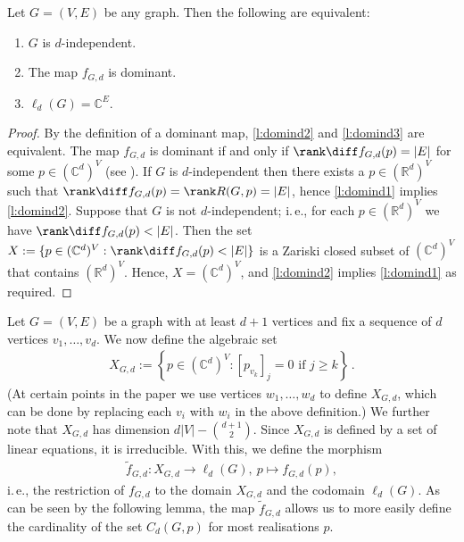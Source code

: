 \begin{lemma}\label{l:domind}
	Let $G=(V,E)$ be any graph.
	Then the following are equivalent:
	\begin{enumerate}
		\item \label{l:domind1} $G$ is $d$-independent.
		\item \label{l:domind2} The map $f_{G,d}$ is dominant.
		\item \label{l:domind3} $\ell_d(G) = \mathbb{C}^E$.
	\end{enumerate}
\end{lemma} 

\begin{proof}
	By the definition of a dominant map, \ref{l:domind2} and \ref{l:domind3} are equivalent.
	The map $f_{G,d}$ is dominant if and only if $\rank \diff f_{G,d}(p) = |E|$ for some $p \in (\mathbb{C}^{d})^V$ (see ).
	If $G$ is $d$-independent then there exists a $p \in (\mathbb{R}^{d})^V$ such that $\rank \diff f_{G,d}(p) = \rank R(G,p) = |E|$,
	hence \ref{l:domind1} implies \ref{l:domind2}.
	Suppose that $G$ is not $d$-independent;
	i.\,e., for each $p \in (\mathbb{R}^{d})^V$ we have $\rank \diff f_{G,d}(p) < |E|$.
	Then the set $X := \{ p \in (\mathbb{C}^{d})^V: \rank \diff f_{G,d}(p) < |E| \}$ is a Zariski closed subset of $(\mathbb{C}^{d})^V$ that contains $(\mathbb{R}^{d})^V$.
	Hence, $X = (\mathbb{C}^{d})^V$,
	and \ref{l:domind2} implies \ref{l:domind1} as required.
\end{proof}

Let $G=(V,E)$ be a graph with at least $d+1$ vertices and fix a sequence of $d$ vertices $v_1,\ldots, v_d$.
We now define the algebraic set
\begin{align}\label{eq:xset}
	X_{G,d} := \left\{ p \in (\mathbb{C}^{d})^V : [p_{v_k}]_j=0 \text{ if } j \geq k  \right\}\,.
\end{align}
(At certain points in the paper we use vertices $w_1,\ldots,w_d$ to define $X_{G,d}$,
which can be done by replacing each $v_i$ with $w_i$ in the above definition.)
We further note that $X_{G,d}$ has dimension $d|V| - \binom{d+1}{2}$.
Since $X_{G,d}$ is defined by a set of linear equations,
it is irreducible.
With this, we define the morphism
\begin{align*}
	\tilde{f}_{G,d} : X_{G,d} \rightarrow \ell_d(G), ~ p \mapsto f_{G,d}(p),
\end{align*}
i.\,e., the restriction of $f_{G,d}$ to the domain $X_{G,d}$ and the codomain $\ell_d(G)$.
As can be seen by the following lemma, the map $\tilde{f}_{G,d}$ allows us to more easily define the cardinality of the set $C_d(G,p)$ for most realisations $p$.

